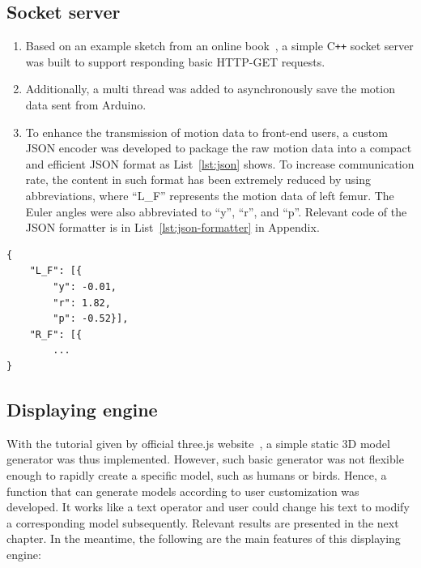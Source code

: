 \subsection{Socket server}
\begin{enumerate}
	\item   Based on an example sketch from an online book~\cite{beej-guide}, a simple C\texttt{++} socket server was built to support responding basic HTTP-GET requests.
	\item   Additionally, a multi thread was added to asynchronously save the motion data sent from Arduino.
	\item   To enhance the transmission of motion data to front-end users, a custom JSON encoder was developed to package the raw motion data into a compact and efficient JSON format as List~\ref{lst:json} shows.
	To increase communication rate, the content in such format has been extremely reduced by using abbreviations, where ``L\_F'' represents the motion data of left femur.
	The Euler angles were also abbreviated to ``y'', ``r'', and ``p''.
	Relevant code of the JSON formatter is in List~\ref{lst:json-formatter} in Appendix.
\end{enumerate}

\lstset{
	language=json,
	numbers=left,
	firstnumber=1
}
\begin{lstlisting}[caption={JSON code sent to front-end client.},label={lst:json}]
{
	"L_F": [{
		"y": -0.01,
		"r": 1.82,
		"p": -0.52}],
	"R_F": [{
		...
}
\end{lstlisting}


\subsection{Displaying engine}\label{subsec:engine}

With the tutorial given by official three.js website~\cite{threejs}, a simple static 3D model generator was thus implemented.
However, such basic generator was not flexible enough to rapidly create a specific model, such as humans or birds.
Hence, a function that can generate models according to user customization was developed.
It works like a text operator and user could change his text to modify a corresponding model subsequently.
Relevant results are presented in the next chapter.
In the meantime, the following are the main features of this displaying engine:

